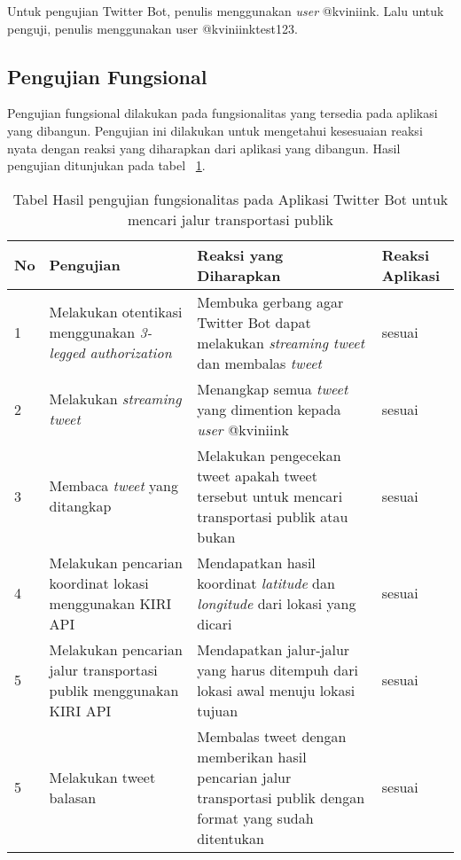 Untuk pengujian Twitter Bot, penulis menggunakan \textit{user} @kviniink. Lalu untuk penguji, penulis menggunakan user @kviniinktest123.

\subsection{Pengujian Fungsional}
Pengujian fungsional dilakukan pada fungsionalitas yang tersedia pada aplikasi yang dibangun. Pengujian ini dilakukan untuk mengetahui kesesuaian reaksi nyata dengan reaksi yang diharapkan dari aplikasi yang dibangun. Hasil pengujian ditunjukan pada tabel ~\ref{tab:TabelHasilPengujianFungsionalitasPadaAplikasiTwitterBotUntukMencariJalurTransportasiPublik}.

\begin{table}[h]
		\begin{tabular}{|p{1cm}|p{5cm}|p{5cm}|p{2cm}|}
			\hline
				No & Pengujian & Reaksi yang Diharapkan & Reaksi Aplikasi  \\ \hline
				1 & Melakukan otentikasi menggunakan \textit{3-legged authorization} & Membuka gerbang agar Twitter Bot dapat melakukan \textit{streaming tweet} dan membalas \textit{tweet} &  sesuai \\ \hline
				2 & Melakukan \textit{streaming tweet} & Menangkap semua \textit{tweet} yang dimention kepada \textit{user} @kviniink & sesuai  \\ \hline
				3 & Membaca \textit{tweet} yang ditangkap & Melakukan pengecekan tweet apakah tweet tersebut untuk mencari transportasi publik atau bukan & sesuai  \\ \hline
				4 & Melakukan pencarian koordinat lokasi menggunakan KIRI API & Mendapatkan hasil koordinat \textit{latitude} dan \textit{longitude} dari lokasi yang dicari & sesuai  \\ \hline
				5 & Melakukan pencarian jalur transportasi publik menggunakan KIRI API & Mendapatkan jalur-jalur yang harus ditempuh dari lokasi awal menuju lokasi tujuan &  sesuai \\ \hline
				5 & Melakukan tweet balasan & Membalas tweet dengan memberikan hasil pencarian jalur transportasi publik dengan format yang sudah ditentukan &  sesuai \\ \hline
		\end{tabular}
	\caption{Tabel Hasil pengujian fungsionalitas pada Aplikasi Twitter Bot untuk mencari jalur transportasi publik}
	\label{tab:TabelHasilPengujianFungsionalitasPadaAplikasiTwitterBotUntukMencariJalurTransportasiPublik}
\end{table}

